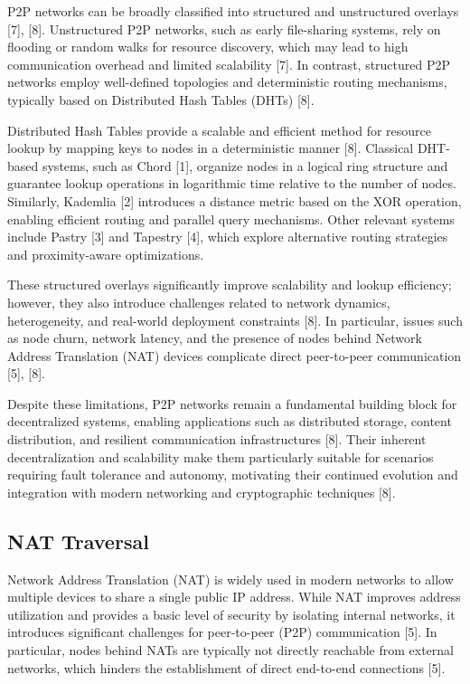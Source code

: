 \documentclass[12pt,a4paper]{article}
\begin{document}
P2P networks can be broadly classified into structured and unstructured overlays [7], [8]. Unstructured P2P networks, such as early file-sharing systems, rely on flooding or random walks for resource discovery, which may lead to high communication overhead and limited scalability [7]. In contrast, structured P2P networks employ well-defined topologies and deterministic routing mechanisms, typically based on Distributed Hash Tables (DHTs) [8].

Distributed Hash Tables provide a scalable and efficient method for resource lookup by mapping keys to nodes in a deterministic manner [8]. Classical DHT-based systems, such as Chord [1], organize nodes in a logical ring structure and guarantee lookup operations in logarithmic time relative to the number of nodes. Similarly, Kademlia [2] introduces a distance metric based on the XOR operation, enabling efficient routing and parallel query mechanisms. Other relevant systems include Pastry [3] and Tapestry [4], which explore alternative routing strategies and proximity-aware optimizations.

These structured overlays significantly improve scalability and lookup efficiency; however, they also introduce challenges related to network dynamics, heterogeneity, and real-world deployment constraints [8]. In particular, issues such as node churn, network latency, and the presence of nodes behind Network Address Translation (NAT) devices complicate direct peer-to-peer communication [5], [8].

Despite these limitations, P2P networks remain a fundamental building block for decentralized systems, enabling applications such as distributed storage, content distribution, and resilient communication infrastructures [8]. Their inherent decentralization and scalability make them particularly suitable for scenarios requiring fault tolerance and autonomy, motivating their continued evolution and integration with modern networking and cryptographic techniques [8].

\subsection{NAT Traversal}

Network Address Translation (NAT) is widely used in modern networks to allow multiple devices to share a single public IP address. While NAT improves address utilization and provides a basic level of security by isolating internal networks, it introduces significant challenges for peer-to-peer (P2P) communication [5]. In particular, nodes behind NATs are typically not directly reachable from external networks, which hinders the establishment of direct end-to-end connections [5].
\end{document}
